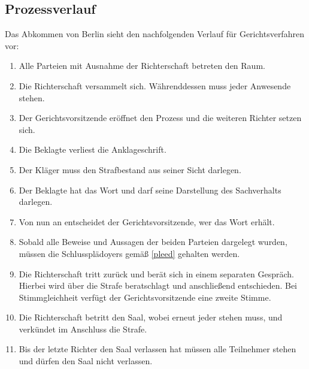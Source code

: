 \documentclass{article}
\begin{document}
\subsection{Prozessverlauf}\label{verlauf}
Das Abkommen von Berlin sieht den nachfolgenden Verlauf für Gerichtsverfahren vor:
\begin{enumerate}[1.]
    \item Alle Parteien mit Ausnahme der Richterschaft betreten den Raum.
    \item Die Richterschaft versammelt sich. Währenddessen muss jeder Anwesende stehen.
    \item Der Gerichtsvorsitzende eröffnet den Prozess und die weiteren Richter setzen sich.
    \item Die Beklagte verliest die Anklageschrift.
    \item Der Kläger muss den Strafbestand aus seiner Sicht darlegen.
    \item Der Beklagte hat das Wort und darf seine Darstellung des Sachverhalts darlegen.
    \item Von nun an entscheidet der Gerichtsvorsitzende, wer das Wort erhält.
    \item Sobald alle Beweise und Aussagen der beiden Parteien dargelegt wurden, müssen die Schlussplädoyers gemäß \ref{pleed} gehalten werden.
    \item Die Richterschaft tritt zurück und berät sich in einem separaten Gespräch. Hierbei wird über die Strafe beratschlagt und anschließend entschieden. Bei Stimmgleichheit verfügt der Gerichtsvorsitzende eine zweite Stimme.
    \item Die Richterschaft betritt den Saal, wobei erneut jeder stehen muss, und verkündet im Anschluss die Strafe.
    \item Bis der letzte Richter den Saal verlassen hat müssen alle Teilnehmer stehen und dürfen den Saal nicht verlassen.    
\end{enumerate}
\end{document}
